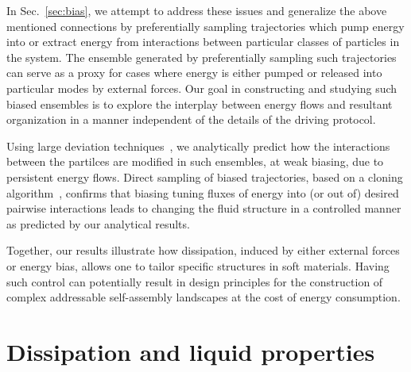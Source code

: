 \documentclass[pre, superscriptaddress, twocolumn,pre]{revtex4-1}
\begin{document}
In Sec.~\ref{sec:bias}, we attempt to address these issues and generalize the above mentioned connections by preferentially sampling trajectories which pump energy into or extract energy from interactions between particular classes of particles in the system. The ensemble generated by preferentially sampling such trajectories can serve as a proxy for cases where energy is either pumped or released into particular modes by external forces. Our goal in constructing and studying such biased ensembles is to explore the interplay between energy flows and resultant organization in a manner independent of the details of the driving protocol. 

Using large deviation techniques~\cite{garrahan2007, Hedges2009, Jack2010, Pitard2011, Speck2012, Bodineau2012a, Chetrite2013, Limmer2014, Nemoto2017}, we analytically predict how the interactions between the partilces are modified in such ensembles, at weak biasing, due to persistent energy flows. Direct sampling of biased trajectories, based on a cloning algorithm~\cite{Giadina2006, tailleur2007probing, Hurtado2009, Nemoto2016, Ray2018, Klymko2018, Brewer2018}, confirms that biasing tuning fluxes of energy into (or out of) desired pairwise interactions leads to changing the fluid structure in a controlled manner as predicted by our analytical results. 

Together, our results illustrate how dissipation, induced by either external forces or energy bias, allows one to tailor specific structures in soft materials. Having such control can potentially result in design principles for the construction of complex addressable self-assembly landscapes at the cost of energy consumption.





\section{Dissipation and liquid properties}\label{sec:method}
\end{document}
